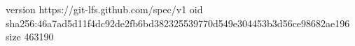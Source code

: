 version https://git-lfs.github.com/spec/v1
oid sha256:46a7ad5d11f4dc92de2fb6bd382325539770d549e304453b3d56ce98682ae196
size 463190
